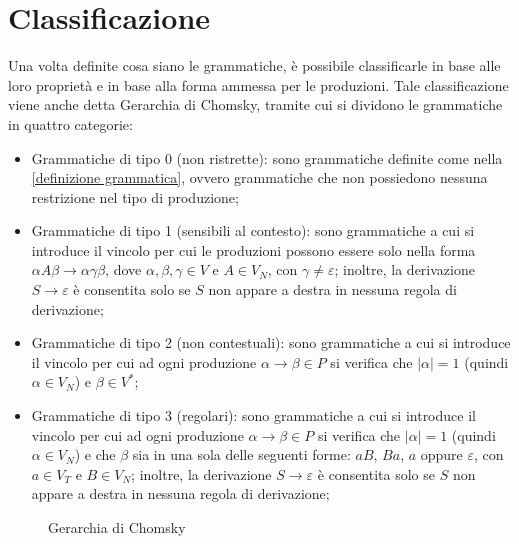   \section{Classificazione}
  Una volta definite cosa siano le grammatiche, è possibile classificarle in base alle loro proprietà e in base alla forma ammessa per le produzioni. Tale classificazione viene anche detta Gerarchia di Chomsky, tramite cui si dividono le grammatiche in quattro categorie:
  \begin{itemize}
    \item Grammatiche di tipo 0 (non ristrette): sono grammatiche definite come nella \ref{definizione grammatica}, ovvero grammatiche che non possiedono nessuna restrizione nel tipo di produzione;
    \item Grammatiche di tipo 1 (sensibili al contesto): sono grammatiche a cui si introduce il vincolo per cui le produzioni possono essere solo nella forma \(\alpha A\beta\to\alpha\gamma\beta\), dove \(\alpha, \beta, \gamma\in V\) e \(A\in V_N\), con \(\gamma\neq\varepsilon\); inoltre, la derivazione \(S\to\varepsilon\) è consentita solo se \(S\) non appare a destra in nessuna regola di derivazione;
    \item Grammatiche di tipo 2 (non contestuali): sono grammatiche a cui si introduce il vincolo per cui ad ogni produzione \(\alpha\to\beta \in P\) si verifica che \(|\alpha| =1\) (quindi \(\alpha \in V_N\)) e \(\beta\in V^*\);
    \item Grammatiche di tipo 3 (regolari): sono grammatiche a cui si introduce il vincolo per cui ad ogni produzione \(\alpha\to\beta \in P\) si verifica che \(|\alpha| = 1\) (quindi \(\alpha \in V_N\)) e che \(\beta\) sia in una sola delle seguenti forme: \(aB\), \(Ba\), \(a\) oppure \(\varepsilon\), con \(a\in V_T\) e \(B\in V_N\); inoltre, la derivazione \(S\to\varepsilon\) è consentita solo se \(S\) non appare a destra in nessuna regola di derivazione;
  \end{itemize} 

  \begin{figure}[!h]
    \begin{center}    
    \end{center}
    \caption{Gerarchia di Chomsky}    
  \end{figure}

